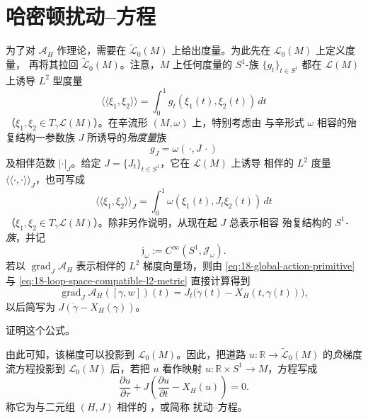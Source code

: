 \section{哈密顿扰动\personCauchy{}--\personRiemann{}方程}
\label{sec:hamiltonian-perturbed-cauchy-riemann-equation}

为了对 $\mathcal A_H$ 作\personMorse{}理论，需要在
$\widetilde{\mathcal L}_0(M)$ 上给出度量。为此先在 $\mathcal L_0(M)$ 上定义度量，
再将其拉回 $\widetilde{\mathcal L}_0(M)$。注意，$M$ 上任何\personRiemann{}度量的
$S^1$-族 $\{g_t\}_{t\in S^1}$ 都在 $\mathcal L(M)$ 上诱导 $L^2$ 型度量
\begin{equation}
 \langle\!\langle\xi_1,\xi_2\rangle\!\rangle
 =\int_0^1g_t(\xi_1(t),\xi_2(t))\,dt
 \label{eq:18-loop-space-l2-metric}
\end{equation}
（$\xi_1,\xi_2\in T_\gamma\mathcal L(M)$）。在辛流形 $(M,\omega)$ 上，特别考虑由
与辛形式 $\omega$ 相容的殆复结构一参数族 $J$ 所诱导的\emph{殆\personKahler{}度量}族
\[
 g_J=\omega(\,\cdot,J\,\cdot)
\]
及相伴范数 $|\cdot|_J$。给定 $J=\{J_t\}_{t\in S^1}$，它在 $\mathcal L(M)$ 上诱导
相伴的 $L^2$ 度量 $\langle\!\langle\cdot,\cdot\rangle\!\rangle_J$，也可写成
\begin{equation}
 \langle\!\langle\xi_1,\xi_2\rangle\!\rangle_J
 =\int_0^1\omega(\xi_1(t),J_t\xi_2(t))\,dt
 \label{eq:18-loop-space-compatible-l2-metric}
\end{equation}
（$\xi_1,\xi_2\in T_\gamma\mathcal L(M)$）。除非另作说明，从现在起 $J$ 总表示相容
殆复结构的 \emph{$S^1$-族}，并记
\[
 \mathfrak j_\omega:=C^\infty(S^1,\mathcal J_\omega).
\]
若以 $\operatorname{grad}_J\mathcal A_H$ 表示相伴的 $L^2$ 梯度向量场，则由
\eqref{eq:18-global-action-primitive} 与
\eqref{eq:18-loop-space-compatible-l2-metric} 直接计算得到
\begin{equation}
 \operatorname{grad}_J\mathcal A_H([\gamma,w])(t)
 =J_t\bigl(\dot\gamma(t)-X_H(t,\gamma(t))\bigr),
 \label{eq:18-action-l2-gradient}
\end{equation}
以后简写为 $J(\dot\gamma-X_H(\gamma))$。

\begin{exercise}
\label{ex:18-prove-action-gradient}
证明这个公式。
\end{exercise}

由此可知，该梯度可以投影到 $\mathcal L_0(M)$。因此，把道路
$u:\mathbb R\to\widetilde{\mathcal L}_0(M)$ 的\emph{负}梯度流方程投影到
$\mathcal L_0(M)$ 后，若把 $u$ 看作映射 $u:\mathbb R\times S^1\to M$，方程写成
\begin{equation}
 \frac{\partial u}{\partial\tau}
 +J\left(\frac{\partial u}{\partial t}-X_H(u)\right)=0.
 \label{eq:18-floer-perturbed-cr-equation}
\end{equation}
称它为与二元组 $(H,J)$ 相伴的\emph{\personFloer{} \termPerturbedCauchyRiemannEquation{}}，或简称
扰动\personCauchy{}--\personRiemann{}方程。

